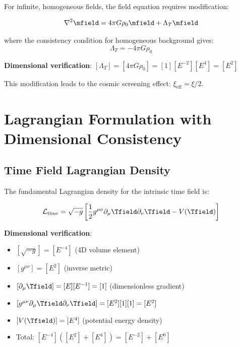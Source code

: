 	For infinite, homogeneous fields, the field equation requires modification:
	
	\begin{equation}
		\nabla^2 \mfield = 4\pi G \rho_0 \mfield + \Lambda_T \mfield
		\label{eq:modified_field_equation}
	\end{equation}
	
	where the consistency condition for homogeneous background gives:
	\begin{equation}
		\Lambda_T = -4\pi G \rho_0
		\label{eq:lambda_t_definition}
	\end{equation}
	
	\textbf{Dimensional verification}: $[\Lambda_T] = [4\pi G \rho_0] = [1][E^{-2}][E^4] = [E^2]$ \checkmark
	
	This modification leads to the cosmic screening effect: $\xi_{\text{eff}} = \xi/2$.
	
	\section{Lagrangian Formulation with Dimensional Consistency}
	\label{sec:lagrangian_formulation}
	
	\subsection{Time Field Lagrangian Density}
	\label{subsec:time_field_lagrangian}
	
	The fundamental Lagrangian density for the intrinsic time field is:
	
	\begin{equation}
		\mathcal{L}_{\text{time}} = \sqrt{-g} \left[\frac{1}{2} g^{\mu\nu} \partial_\mu \Tfield \partial_\nu \Tfield - V(\Tfield)\right]
		\label{eq:time_field_lagrangian}
	\end{equation}
	
	\textbf{Dimensional verification}:
	\begin{itemize}
		\item $[\sqrt{-g}] = [E^{-4}]$ (4D volume element)
		\item $[g^{\mu\nu}] = [E^2]$ (inverse metric)
		\item $[\partial_\mu \Tfield] = [E][E^{-1}] = [1]$ (dimensionless gradient)
		\item $[g^{\mu\nu} \partial_\mu \Tfield \partial_\nu \Tfield] = [E^2][1][1] = [E^2]$
		\item $[V(\Tfield)] = [E^4]$ (potential energy density)
		\item Total: $[E^{-4}]([E^2] + [E^4]) = [E^{-2}] + [E^0]$ \checkmark
	\end{itemize}
	
